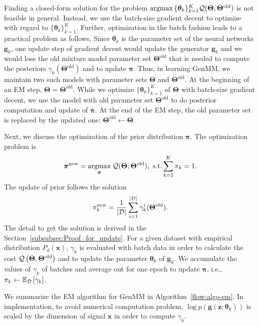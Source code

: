 Finding a closed-form solution for the problem $\operatorname{argmax}{\{\bm{\theta}_k\}_{k=1}^{K}}{ \mathcal{Q} (\bm{\Theta},\bm{\Theta}^{\mathrm{old}})}$ is not feasible in general. Instead, we use the batch-size gradient decent to optimize with regard to $\{\bm{\theta}_k\}_{k=1}^{K}$.
Further, optimization in the batch fashion leads to a practical problem as follows. 
Since $\bm{\theta}_k$ is the parameter set of the neural networks $\bm{g}_k$, one update step of gradient decent would update the generator $\bm{g}_k$ and we would lose the old mixture model parameter set $\bm{\Theta}^{\mathrm{old}}$ that is needed to compute the posteriors $\gamma_k(\bm{\Theta}^{\mathrm{old}})$ and to update $\bm{\pi}$. Thus, in learning GenMM, we maintain two such models with parameter sets $\bm{\Theta}$ and $\bm{\Theta}^{\mathrm{old}}$. At the beginning of an EM step, $\bm{\Theta} = \bm{\Theta}^{\mathrm{old}}$. While we optimize $\{\bm{\theta}_k\}_{k=1}^{K}$ of $\bm{\Theta}$ with batch-size gradient decent, we use the model with old parameter set $\bm{\Theta}^{\mathrm{old}}$ to do posterior computation and update of $\bm{\pi}$. At the end of the EM step, the old parameter set is replaced by the updated one: $\bm{\Theta}^{\mathrm{old}}\gets \bm{\Theta}$.



Next, we discuss the optimization of the prior distribution $\bm{\pi}$. The optimization problem is 
\begin{equation}\label{eq-pi-update1}
  \bm{\pi}^{\mathrm{new}} = \underset{\bm{\pi}}{\operatorname{argmax}}\;{ \mathcal{Q}
    (\bm{\Theta},\bm{\Theta}^{\mathrm{old}})}, \,\,
  \mathrm{s.t.} \sum_{k=1}^{K}\pi_k = 1.
\end{equation}
The update of prior follows the solution
\begin{equation}\label{eq-pi-solution}
  \pi_k^{\mathrm{new}} = \frac{1}{| \mathcal{D} |}\sum_{i=1}^{| \mathcal{D} |}\gamma_k^{i}(\bm{\Theta}^{\mathrm{old}}).
\end{equation}
The detail to get the solution is derived in the Section~\ref{subsubsec:Proof_for_update}. For a given dataset with empirical distribution $P_d(\bm{x})$,
$\gamma_k$ is evaluated with batch data in order to calculate the cost
$\mathcal{Q}\left(\bm{\Theta},\bm{\Theta}^{\mathrm{old}}\right)$ and to update the
parameter $\bm{\theta}_k$ of $\bm{g}_k$. We accumulate the values of $\gamma_k$ of batches and
average out for one epoch to update $\bm{\pi}$, {i.e.}, $\pi_k \gets \mathbb{E}_{\mathcal{D}}\left[ \gamma_k \right]$.



We summarize the EM algorithm for GenMM in Algorithm~\ref{flow-algo-em}.
In implementation, to avoid numerical computation problem, $\log{p(\bm{g}(\bm{z}; \bm{\theta}_k))}$ is
scaled by the dimension of signal $\bm{x}$ in order to compute $\gamma_k$. 

